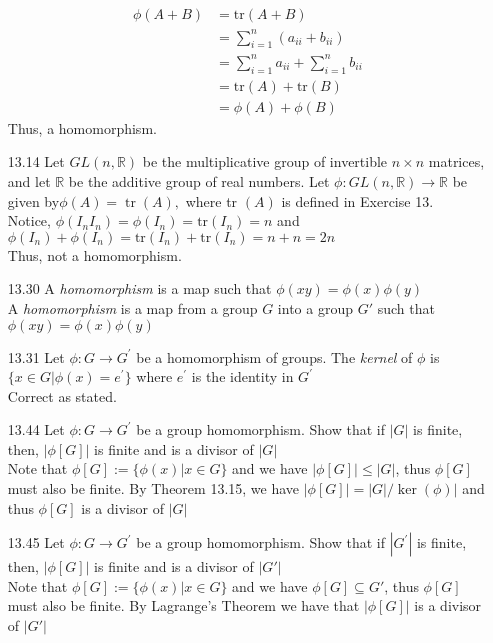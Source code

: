 \documentclass[12pt]{article}
\newcommand{\R}{\mathbb{R}}
\begin{document}
\begin{enumerate}
\begin{align*}
		\phi(A+B) &= \textrm{tr}(A+B) \\
				  &= \sum_{i=1}^n (a_{ii} + b_{ii})\\
				  &= \sum_{i=1}^n a_{ii} + \sum_{i=1}^n b_{ii}\\
				  &= \textrm{tr}(A)+\textrm{tr}(B)\\
				  &= \phi(A) + \phi(B)
	\end{align*}
	Thus, a homomorphism.
	\item[13.14] Let $ G L ( n , \R ) $ be the multiplicative group of invertible $ n \times n $ matrices, and let $ \R $ be the additive group of real numbers. Let $ \phi : G L ( n , \R ) \rightarrow \R $ be given by$ \phi ( A ) = \operatorname { tr } ( A ) ,$ where  tr $( A ) $ is defined in Exercise 13.\\
	Notice, $ \phi(I_nI_n)=\phi(I_n)=\textrm{tr}(I_n)=n $ and $\phi(I_n) +\phi(I_n)=\textrm{tr}(I_n)+\textrm{tr}(I_n)=n+n=2n $\\
	Thus, not a homomorphism.
	
	\item[13.30] A \textit{homomorphism} is a map such that $ \phi ( x y ) = \phi ( x ) \phi ( y ) $\\
	A \textit{homomorphism} is a map from a group $ G $ into a group $ G' $ such that $ \phi ( x y ) = \phi ( x ) \phi ( y ) $
	
	\item[13.31] Let $ \phi : G \rightarrow G ^ { \prime } $ be a homomorphism of groups. The \textit{kernel} of $ \phi $ is $ \{ x \in G | \phi ( x ) = e ^ { \prime } \} $ where $ e ^ { \prime } $ is the identity in $ G^{\prime} $\\
	Correct as stated.
	\item[13.44] Let $ \phi : G \rightarrow G ^ { \prime } $ be a group homomorphism. Show that if $ \left| G \right| $ is finite, then, $ | \phi [ G ] | $ is finite and is a divisor of $ | G | $\\
	Note that $ \phi[G] := \{\phi(x)|x\in G\}$ and we have $ |\phi[G]|\leq|G| $, thus $ \phi[G] $ must also be finite. By Theorem 13.15, we have $ |\phi[G]|=|G|/\ker(\phi)| $ and thus $ \phi[G] $ is a divisor of $ |G| $
	\item[13.45] Let $ \phi : G \rightarrow G ^ { \prime } $ be a group homomorphism. Show that if $ \left| G ^ { \prime } \right| $ is finite, then, $ | \phi [ G ] | $ is finite and is a divisor of $ | G' | $\\
	Note that $ \phi[G] := \{\phi(x)|x\in G\}$ and we have $ \phi[G]\subseteq G' $, thus $ \phi[G] $ must also be finite. By Lagrange's Theorem we have that $ |\phi[G]| $ is a divisor of $ |G'| $
	

\end{enumerate}
\end{document}
